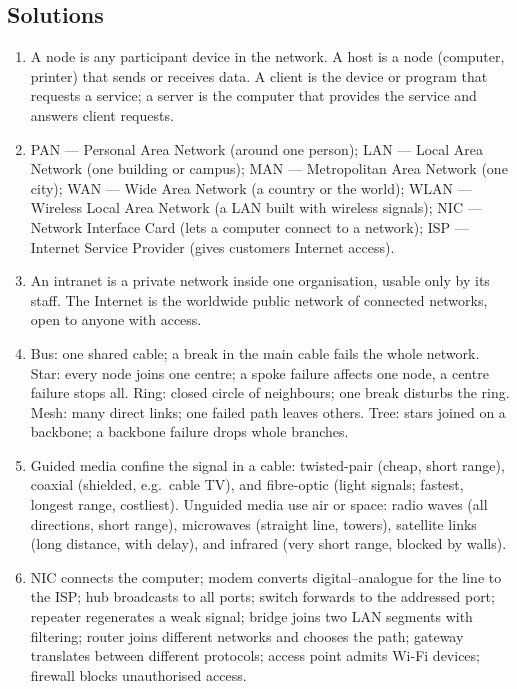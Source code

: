 \subsection*{Solutions}
\begingroup\small
\begin{enumerate}[label=\arabic*.]
  \item A node is any participant device in the network. A host is a node
    (computer, printer) that sends or receives data. A client is the device
    or program that requests a service; a server is the computer that
    provides the service and answers client requests.
  \item PAN --- Personal Area Network (around one person); LAN --- Local Area
    Network (one building or campus); MAN --- Metropolitan Area Network (one
    city); WAN --- Wide Area Network (a country or the world); WLAN ---
    Wireless Local Area Network (a LAN built with wireless signals); NIC ---
    Network Interface Card (lets a computer connect to a network); ISP ---
    Internet Service Provider (gives customers Internet access).
  \item An intranet is a private network inside one organisation, usable only
    by its staff. The Internet is the worldwide public network of connected
    networks, open to anyone with access.
  \item Bus: one shared cable; a break in the main cable fails the whole
    network. Star: every node joins one centre; a spoke failure affects one
    node, a centre failure stops all. Ring: closed circle of neighbours; one
    break disturbs the ring. Mesh: many direct links; one failed path leaves
    others. Tree: stars joined on a backbone; a backbone failure drops whole
    branches.
  \item Guided media confine the signal in a cable: twisted-pair (cheap,
    short range), coaxial (shielded, e.g.\ cable TV), and fibre-optic
    (light signals; fastest, longest range, costliest). Unguided media use
    air or space: radio waves (all directions, short range), microwaves
    (straight line, towers), satellite links (long distance, with delay),
    and infrared (very short range, blocked by walls).
  \item NIC connects the computer; modem converts digital--analogue for the
    line to the ISP; hub broadcasts to all ports; switch forwards to the
    addressed port; repeater regenerates a weak signal; bridge joins two LAN
    segments with filtering; router joins different networks and chooses the
    path; gateway translates between different protocols; access point admits
    Wi-Fi devices; firewall blocks unauthorised access.
\end{enumerate}
\endgroup

